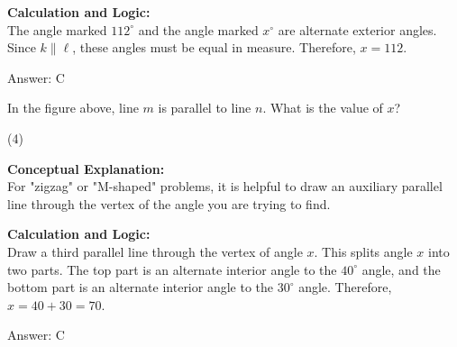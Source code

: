 \documentclass[11pt,paper=a4,answers]{exam}
\begin{document}
\begin{questions}
\begin{solution}
\vspace{30pt}

\textbf{Calculation and Logic:} \\
The angle marked $112^\circ$ and the angle marked $x^\circ$ are alternate exterior angles. Since $k \parallel \ell$, these angles must be equal in measure. Therefore, $x = 112$.

\vspace{30pt}

Answer: \colorbox{yellow!100}{C}
\end{solution}

\vspace{60pt}

\question
\begin{center}
\end{center}
In the figure above, line $m$ is parallel to line $n$. What is the value of $x$?
\begin{tasks}(4)
\end{tasks}

\begin{solution}
\textbf{Conceptual Explanation:} \\
For "zigzag" or "M-shaped" problems, it is helpful to draw an auxiliary parallel line through the vertex of the angle you are trying to find.

\vspace{30pt}

\textbf{Calculation and Logic:} \\
Draw a third parallel line through the vertex of angle $x$. This splits angle $x$ into two parts. The top part is an alternate interior angle to the $40^\circ$ angle, and the bottom part is an alternate interior angle to the $30^\circ$ angle. Therefore, $x = 40 + 30 = 70$.

\vspace{30pt}

Answer: \colorbox{yellow!100}{C}
\end{solution}


\end{questions}
\end{document}
